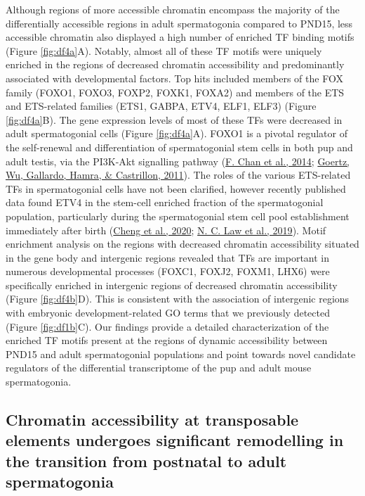 \documentclass[12pt,twoside]{reedthesis}
\begin{document}
Although regions of more accessible chromatin encompass the majority of
the differentially accessible regions in adult spermatogonia compared to
PND15, less accessible chromatin also displayed a high number of
enriched TF binding motifs (Figure \ref{fig:df4a}A). Notably, almost all of these TF
motifs were uniquely enriched in the regions of decreased chromatin
accessibility and predominantly associated with developmental factors.
Top hits included members of the FOX family (FOXO1, FOXO3, FOXP2, FOXK1,
FOXA2) and members of the ETS and ETS-related families (ETS1, GABPA,
ETV4, ELF1, ELF3) (Figure \ref{fig:df4a}B). The gene expression levels of most of these
TFs were decreased in adult spermatogonial cells (Figure \ref{fig:df4a}A). FOXO1 is a
pivotal regulator of the self-renewal and differentiation of
spermatogonial stem cells in both pup and adult testis, via the PI3K-Akt
signalling pathway (\protect\hyperlink{ref-chan2014}{F. Chan et al., 2014}; \protect\hyperlink{ref-goertz2011}{Goertz, Wu, Gallardo, Hamra, \& Castrillon, 2011}). The roles of the various
ETS-related TFs in spermatogonial cells have not been clarified, however
recently published data found ETV4 in the stem-cell enriched fraction of
the spermatogonial population, particularly during the spermatogonial
stem cell pool establishment immediately after birth (\protect\hyperlink{ref-cheng2020}{Cheng et al., 2020}; \protect\hyperlink{ref-law2019}{N. C. Law et al., 2019}). Motif enrichment analysis on the regions with decreased
chromatin accessibility situated in the gene body and intergenic regions
revealed that TFs are important in numerous developmental processes
(FOXC1, FOXJ2, FOXM1, LHX6) were specifically enriched in intergenic
regions of decreased chromatin accessibility (Figure \ref{fig:df4b}D). This is
consistent with the association of intergenic regions with embryonic
development-related GO terms that we previously detected (Figure \ref{fig:df1b}C). Our
findings provide a detailed characterization of the enriched TF motifs
present at the regions of dynamic accessibility between PND15 and adult
spermatogonial populations and point towards novel candidate regulators
of the differential transcriptome of the pup and adult mouse
spermatogonia.

\hypertarget{chromatin-accessibility-at-transposable-elements-undergoes-significant-remodelling-in-the-transition-from-postnatal-to-adult-spermatogonia}{%
\subsection{Chromatin accessibility at transposable elements undergoes significant remodelling in the transition from postnatal to adult spermatogonia}\label{chromatin-accessibility-at-transposable-elements-undergoes-significant-remodelling-in-the-transition-from-postnatal-to-adult-spermatogonia}}
\end{document}
